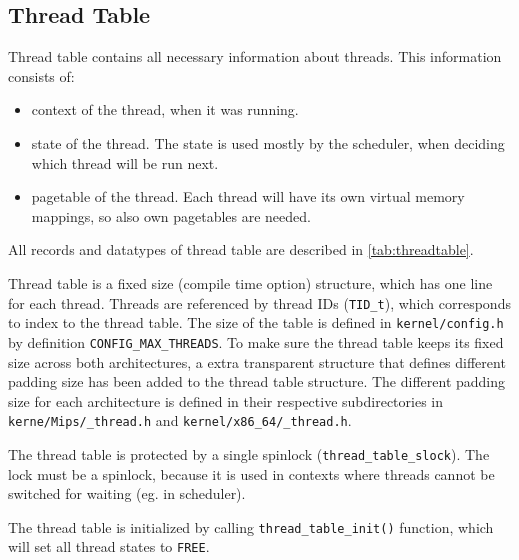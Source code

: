 \documentclass[twoside,a4paper]{report}
\begin{document}
\subsection{Thread Table}
\label{sec:threadtable}


Thread table contains all necessary information about threads. This
information consists of:
\begin{itemize}
\item context of the thread, when it was running.
\item state of the thread. The state is used mostly by the scheduler,
when deciding which thread will be run next.
\item pagetable of the thread. Each thread will have its own virtual
memory mappings, so also own pagetables are needed.
\end{itemize}
All records and datatypes of thread table are described in
\autoref{tab:threadtable}.


Thread table is a fixed size (compile time option) structure, which
has one line for each thread. Threads are referenced by thread IDs
(\texttt{TID\_t}), which corresponds to index to the thread table. The
size of the table is defined in \texttt{kernel/config.h} by definition
\texttt{CONFIG\_MAX\_THREADS}. 
To make sure the thread table keeps its fixed size across both 
architectures, a extra transparent structure that defines different
padding size has been added to the thread table structure.
The different padding size for each architecture is defined in
their respective subdirectories in \texttt{kerne/Mips/\_thread.h}
and \texttt{kernel/x86\_64/\_thread.h}.


The thread table is protected by a single spinlock
(\texttt{thread\_table\_slock}). The lock must be a spinlock, because it
is used in contexts where threads cannot be switched for waiting (eg.
in scheduler). 


The thread table is initialized by calling
\texttt{thread\_table\_init()} function, which will set all thread
states to \texttt{FREE}.
\end{document}
